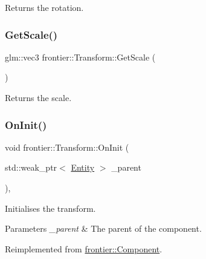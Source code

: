 Returns the rotation. 

\mbox{\label{classfrontier_1_1_transform_ab3468e4e7603e07e2a1d305c15fc4fd2}} 
\subsubsection{\texorpdfstring{Get\+Scale()}{GetScale()}}
{\footnotesize\ttfamily glm\+::vec3 frontier\+::\+Transform\+::\+Get\+Scale (\begin{DoxyParamCaption}{ }\end{DoxyParamCaption})}



Returns the scale. 

\mbox{\label{classfrontier_1_1_transform_a2d8181ec0003b04822124340fe7772c0}} 
\subsubsection{\texorpdfstring{On\+Init()}{OnInit()}\hspace{0.1cm}{\footnotesize\ttfamily [1/4]}}
{\footnotesize\ttfamily void frontier\+::\+Transform\+::\+On\+Init (\begin{DoxyParamCaption}\item[{std\+::weak\+\_\+ptr$<$ \hyperlink{classfrontier_1_1_entity}{Entity} $>$}]{\+\_\+parent }\end{DoxyParamCaption})\hspace{0.3cm}{\ttfamily [override]}, {\ttfamily [virtual]}}



Initialises the transform. 


\begin{DoxyParams}{Parameters}
{\em \+\_\+parent} & The parent of the component. \\
\hline
\end{DoxyParams}


Reimplemented from \hyperlink{classfrontier_1_1_component_af3da02905c4d79219d9b12f260a35ad1}{frontier\+::\+Component}.

\mbox{\label{classfrontier_1_1_transform_a939611da70fc0f33b85fcf92d101ac3e}} 
